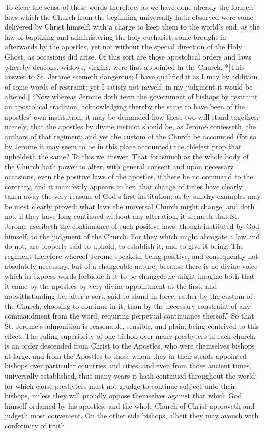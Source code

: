To clear the sense of these words therefore, as we have done already the former: laws which the Church from the beginning universally hath observed were some delivered by Christ himself, with a charge to keep them to the world’s end, as the law of baptizing and administering the holy eucharist; some brought in afterwards by the apostles, yet not without the special direction of the Holy Ghost, as occasions did arise. Of this sort are those apostolical orders and laws whereby deacons, widows, virgins, were first appointed in the Church. *[This answer to St. Jerome seemeth dangerous; I have qualified it as I may by addition of some words of restraint: yet I satisfy not myself, in my judgment it would be altered.] “Now whereas Jerome doth term the government of bishops by restraint an apostolical tradition, acknowledging thereby the same to have been of the apostles’ own institution, it may be demanded how these two will stand together; namely, that the apostles by divine instinct should be, as Jerome confesseth, the authors of that regiment; and yet the custom of the Church be accounted (for so by Jerome it may seem to be in this place accounted) the chiefest prop that upholdeth the same? To this we answer, That forasmuch as the whole body of the Church hath power to alter, with general consent and upon necessary occasions, even the positive laws of the apostles, if there be no command to the contrary, and it manifestly appears to her, that change of times have clearly taken away the very reasons of God’s first institution; as by sundry examples may be most clearly proved: what laws the universal Church might  change, and doth not, if they have long continued without any alteration, it seemeth that St. Jerome ascribeth the continuance of such positive laws, though instituted by God himself, to the judgment of the Church. For they which might abrogate a law and do not, are properly said to uphold, to establish it, and to give it being. The regiment therefore whereof Jerome speaketh being positive, and consequently not absolutely necessary, but of a changeable nature, because there is no divine voice which in express words forbiddeth it to be changed; he might imagine both that it came by the apostles by very divine appointment at the first, and notwithstanding be, after a sort, said to stand in force, rather by the custom of the Church, choosing to continue in it, than by the necessary constraint of any commandment from the word, requiring perpetual continuance thereof.” So that St. Jerome’s admonition is reasonable, sensible, and plain, being contrived to this effect: The ruling superiority of one bishop over many presbyters in each church, is an order descended from Christ to the Apostles, who were themselves bishops at large, and from the Apostles to those whom they in their steads appointed bishops over particular countries and cities; and even from those ancient times, universally established, thus many years it hath continued throughout the world; for which cause presbyters must not grudge to continue subject unto their bishops, unless they will proudly oppose themselves against that which God himself ordained by his apostles, and the whole Church of Christ approveth and judgeth most convenient. On the other side bishops, albeit they may avouch with conformity of truth 